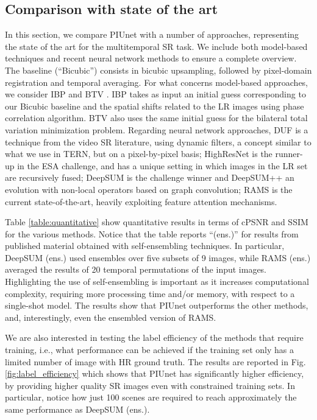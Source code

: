 \documentclass[journal]{IEEEtran}
\begin{document}
\subsection{Comparison with state of the art}
In this section, we compare PIUnet with a number of approaches, representing the state of the art for the multitemporal SR task.  We include both model-based techniques and recent neural network methods to ensure a complete overview. The baseline (``Bicubic'') consists in bicubic upsampling, followed by pixel-domain registration and temporal averaging. For what concerns model-based approaches, we consider IBP \cite{IRANI1991231} and BTV \cite{1331445}. IBP takes  as  input  an  initial  guess corresponding to our Bicubic baseline and the spatial shifts related to the LR images using phase correlation algorithm. BTV also uses the same initial guess for the bilateral total variation minimization problem. Regarding neural network approaches, DUF \cite{Jo_2018_CVPR} is a technique from the video SR literature, using dynamic filters, a concept similar to what we use in TERN, but on a pixel-by-pixel basis; HighResNet \cite{rarefin2020multi} is the runner-up in the ESA challenge, and has a unique setting in which images in the LR set are recursively fused; DeepSUM \cite{molini2019deepsum} is the challenge winner and DeepSUM++ \cite{molini2020deepsumpp} an evolution with non-local operators based on graph convolution; RAMS \cite{salvetti2020multi} is the current state-of-the-art, heavily exploiting feature attention mechanisms.  

Table \ref{table:quantitative} show quantitative results in terms of cPSNR and SSIM for the various methods. Notice that the table reports ``(ens.)'' for results from published material obtained with self-ensembling techniques. In particular, DeepSUM (ens.) used ensembles over five subsets of 9 images, while RAMS (ens.) averaged the results of 20 temporal permutations of the input images. Highlighting the use of self-ensembling is important as it increases computational complexity, requiring more processing time and/or memory, with respect to a single-shot model. The results show that PIUnet outperforms the other methods, and, interestingly, even the ensembled version of RAMS.

We are also interested in testing the label efficiency of the methods that require training, i.e., what performance can be achieved if the training set only has a limited number of image with HR ground truth. The results are reported in Fig. \ref{fig:label_efficiency} which shows that PIUnet has significantly higher efficiency, by providing higher quality SR images even with constrained training sets. In particular, notice how just 100 scenes are required to reach approximately the same performance as DeepSUM (ens.).
\end{document}
